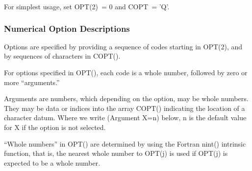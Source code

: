 \documentclass[twoside]{MATH77}
\begin{document}
For simplest usage, set OPT(2)~= 0 and COPT~= 'Q'.

\subsubsection{Numerical Option Descriptions\label{Numopt}}
Options are specified by providing a sequence of codes starting in OPT(2),
and by sequences of characters in COPT().

For options specified in OPT(), each code is a whole number, followed by
zero or more ``arguments.''

Arguments are numbers, which depending on the option, may be whole
numbers.  They may be data or indices into the array COPT() indicating the
location of a character datum.  Where we write (Argument X=n) below, n is
the default value for X if the option is not selected.

``Whole numbers'' in OPT() are determined by using the Fortran nint()
intrinsic function, that is, the nearest whole number to OPT(j) is used
if OPT(j) is expected to be a whole number.
\end{document}
